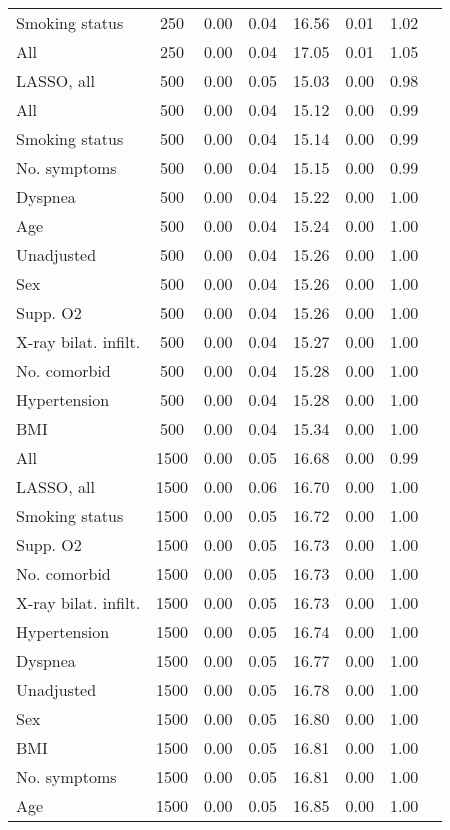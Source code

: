 \documentclass{article}
\begin{document}
{\begin{longtable}{lccccccc}
Smoking status & 250 & 0.00 & 0.04 & 16.56 &  0.01 & 1.02 \\ 
All & 250 & 0.00 & 0.04 & 17.05 &  0.01 & 1.05 \\ \midrule 
LASSO, all & 500 & 0.00 & 0.05 & 15.03 &  0.00 & 0.98 \\ 
All & 500 & 0.00 & 0.04 & 15.12 &  0.00 & 0.99 \\ 
Smoking status & 500 & 0.00 & 0.04 & 15.14 &  0.00 & 0.99 \\ 
No. symptoms & 500 & 0.00 & 0.04 & 15.15 &  0.00 & 0.99 \\ 
Dyspnea & 500 & 0.00 & 0.04 & 15.22 &  0.00 & 1.00 \\ 
Age & 500 & 0.00 & 0.04 & 15.24 &  0.00 & 1.00 \\ 
Unadjusted & 500 & 0.00 & 0.04 & 15.26 &  0.00 & 1.00 \\ 
Sex & 500 & 0.00 & 0.04 & 15.26 &  0.00 & 1.00 \\ 
Supp. O2 & 500 & 0.00 & 0.04 & 15.26 &  0.00 & 1.00 \\ 
X-ray bilat. infilt. & 500 & 0.00 & 0.04 & 15.27 &  0.00 & 1.00 \\ 
No. comorbid & 500 & 0.00 & 0.04 & 15.28 &  0.00 & 1.00 \\ 
Hypertension & 500 & 0.00 & 0.04 & 15.28 &  0.00 & 1.00 \\ 
BMI & 500 & 0.00 & 0.04 & 15.34 &  0.00 & 1.00 \\ \midrule 
All & 1500 & 0.00 & 0.05 & 16.68 &  0.00 & 0.99 \\ 
LASSO, all & 1500 & 0.00 & 0.06 & 16.70 &  0.00 & 1.00 \\ 
Smoking status & 1500 & 0.00 & 0.05 & 16.72 &  0.00 & 1.00 \\ 
Supp. O2 & 1500 & 0.00 & 0.05 & 16.73 &  0.00 & 1.00 \\ 
No. comorbid & 1500 & 0.00 & 0.05 & 16.73 &  0.00 & 1.00 \\ 
X-ray bilat. infilt. & 1500 & 0.00 & 0.05 & 16.73 &  0.00 & 1.00 \\ 
Hypertension & 1500 & 0.00 & 0.05 & 16.74 &  0.00 & 1.00 \\ 
Dyspnea & 1500 & 0.00 & 0.05 & 16.77 &  0.00 & 1.00 \\ 
Unadjusted & 1500 & 0.00 & 0.05 & 16.78 &  0.00 & 1.00 \\ 
Sex & 1500 & 0.00 & 0.05 & 16.80 &  0.00 & 1.00 \\ 
BMI & 1500 & 0.00 & 0.05 & 16.81 &  0.00 & 1.00 \\ 
No. symptoms & 1500 & 0.00 & 0.05 & 16.81 &  0.00 & 1.00 \\ 
Age & 1500 & 0.00 & 0.05 & 16.85 &  0.00 & 1.00 \\
\bottomrule
\hline
\end{longtable}
}
\end{document}
